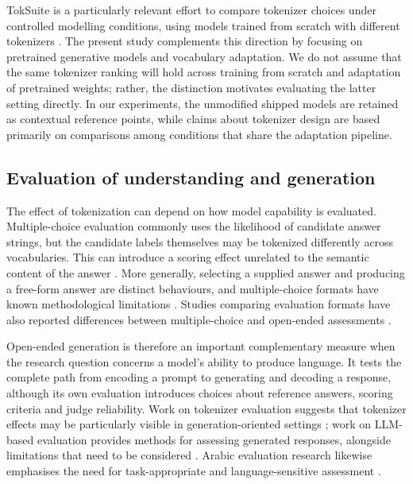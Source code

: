 \documentclass[a4paper,fleqn]{cas-sc}
\begin{document}
TokSuite is a particularly relevant effort to compare tokenizer choices under controlled modelling conditions, using models trained from scratch with different tokenizers \citep{altintas2025toksuite}. The present study complements this direction by focusing on pretrained generative models and vocabulary adaptation. We do not assume that the same tokenizer ranking will hold across training from scratch and adaptation of pretrained weights; rather, the distinction motivates evaluating the latter setting directly. In our experiments, the unmodified shipped models are retained as contextual reference points, while claims about tokenizer design are based primarily on comparisons among conditions that share the adaptation pipeline.

\subsection{Evaluation of understanding and generation}
\label{sec:related:eval}

The effect of tokenization can depend on how model capability is evaluated. Multiple-choice evaluation commonly uses the likelihood of candidate answer strings, but the candidate labels themselves may be tokenized differently across vocabularies. This can introduce a scoring effect unrelated to the semantic content of the answer \citep{zheng2024large,sanzguerrero2025mind}. More generally, selecting a supplied answer and producing a free-form answer are distinct behaviours, and multiple-choice formats have known methodological limitations \citep{balepur2025which,lyu2024beyond}. Studies comparing evaluation formats have also reported differences between multiple-choice and open-ended assessments \citep{wei2024rethinking,myrzakhan2024open,chandak2025answer}.

Open-ended generation is therefore an important complementary measure when the research question concerns a model's ability to produce language. It tests the complete path from encoding a prompt to generating and decoding a response, although its own evaluation introduces choices about reference answers, scoring criteria and judge reliability. Work on tokenizer evaluation suggests that tokenizer effects may be particularly visible in generation-oriented settings \citep{goldman2024unpacking}; work on LLM-based evaluation provides methods for assessing generated responses, alongside limitations that need to be considered \citep{zheng2023judging}. Arabic evaluation research likewise emphasises the need for task-appropriate and language-sensitive assessment \citep{elfilali2024rethinking}.
\end{document}
